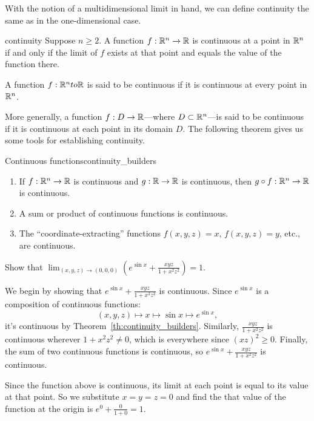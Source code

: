 \documentclass[svgnames]{watsonbook}
\begin{document}
With the notion of a multidimensional limit in hand, we can define
continuity the same as in the one-dimensional case. 

\begin{defn}{}{continuity}
  Suppose $n \geq 2$. A function $f: \mathbb{R}^n \to \mathbb{R}$ is continuous at a
  point in $\mathbb{R}^n$ if and only if the limit of $f$ exists at that point
  and equals the value of the function there.

  A function $f: \mathbb{R}^n to \mathbb{R}$ is said to be continuous if it is
  continuous at every point in $\mathbb{R}^n$. 
\end{defn}

More generally, a function $f:D \to \mathbb{R}$---where $D \subset \mathbb{R}^n$---is
said to be continuous if it is continuous at each point in its
domain $D$. The following theorem gives us some tools for establishing
continuity. 

\begin{theo}{Continuous functions}{continuity_builders}
  \begin{enumerate} 
    \item If $f : \mathbb{R}^n \to \mathbb{R}$ is continuous and $g: \mathbb{R} \to \mathbb{R}$
    is continuous, then $g\circ f :\mathbb{R}^n \to \mathbb{R}$ is
    continuous.
  \item A sum or product of continuous functions is continuous. 
  \item The ``coordinate-extracting'' functions $f(x,y,z) = x$, $f(x,y,z) = y$, etc., are
    continuous.
  \end{enumerate}
\end{theo}

\begin{example}{}{}
  Show that $\displaystyle{\lim_{(x,y,z) \to (0,0,0)}\left(e^{\sin x} + \frac{xyz}{1 + x^2
    z^2}\right)} = 1$. 
\end{example}

\begin{solution}
  We begin by showing that $e^{\sin x} + \frac{xyz}{1 + x^2 z^2}$ is
    continuous.  Since $e^{\sin x}$ is a composition of continuous
    functions:
  \[
  (x,y,z) \mapsto x \mapsto \sin x \mapsto e^{\sin x}, 
  \]
  it's continuous by Theorem~\ref{th:continuity_builders}. Similarly,
  $\frac{xyz}{1 + x^2 z^2}$ is continuous wherever $1 + x^2 z^2 \neq
  0$, which is everywhere since $(xz)^2 \geq 0$. Finally, the sum of
  two continuous functions is continuous, so $e^{\sin x} +
  \frac{xyz}{1 + x^2 z^2}$ is continuous.

  Since the function above is continuous, its limit at each point is
  equal to its value at that point. So we substitute $x=y=z=0$ and
  find the that value of the function at the origin is
  $e^0 + \frac{0}{1+0} = 1$.
\end{solution}
\end{document}
